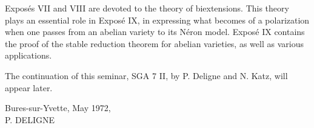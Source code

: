 Exposés VII and VIII are devoted to the theory of biextensions. This theory
plays an essential role in Exposé IX, in expressing what becomes of a
polarization when one passes from an abelian variety to its Néron model. Exposé
IX contains the proof of the stable reduction theorem for abelian varieties,
as well as various applications.

The continuation of this seminar, SGA 7 II, by P. Deligne and N. Katz, will
appear later.

\begin{flushright}
Bures-sur-Yvette, May 1972,\\
P. DELIGNE
\end{flushright}
